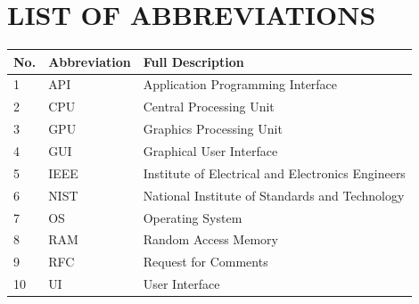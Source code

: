 \chapter*{LIST OF ABBREVIATIONS}

\begin{table}[H]
\centering
\begin{tabular}{|l|l|l|}
\hline
\textbf{No.} & \textbf{Abbreviation} & \textbf{Full Description} \\ \hline
1 & API & Application Programming Interface \\ \hline
2 & CPU & Central Processing Unit \\ \hline
3 & GPU & Graphics Processing Unit \\ \hline
4 & GUI & Graphical User Interface \\ \hline
5 & IEEE & Institute of Electrical and Electronics Engineers \\ \hline
6 & NIST & National Institute of Standards and Technology \\ \hline
7 & OS & Operating System \\ \hline
8 & RAM & Random Access Memory \\ \hline
9 & RFC & Request for Comments \\ \hline
10 & UI & User Interface \\ \hline
\end{tabular}
\end{table}
